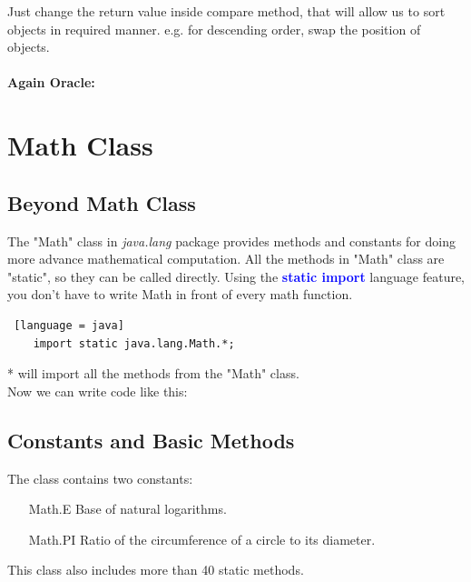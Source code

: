 Just change the return value inside compare method, that will allow us to sort objects in required manner. e.g. for descending order, swap the position of objects.

\paragraph{Again Oracle:}
\section{Math Class}
\subsection{Beyond Math Class}
The "Math" class in \textit{java.lang} package provides methods and constants for doing more advance mathematical computation. All the methods in "Math" class are "static", so they can be called directly. Using the \textbf{\textcolor{blue}{static import}} language feature, you don't have to write Math in front of every math function.
\begin{lstlisting} [language = java]
	import static java.lang.Math.*;
\end{lstlisting}

* will import all the methods from the "Math" class.\\
Now we can write code like this:
\subsection{Constants and Basic Methods}
The class contains two constants:
	\begin{enumerate}
		\item[Math.E] Base of natural logarithms.
		\item[Math.PI] Ratio of the circumference of a circle to its diameter.
	\end{enumerate}
	
This class also includes more than 40 static methods.
	
